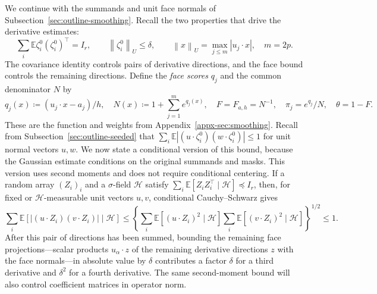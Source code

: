 \documentclass[11pt,letterpaper]{article}
\theoremstyle{remark}
\newcommand{\E}{\mathbb E}
\newcommand{\norm}[1]{\left\lVert#1\right\rVert}
\begin{document}
We continue with the summands and unit face normals of
Subsection~\ref{sec:outline-smoothing}. Recall the two properties
that drive the derivative estimates:
\begin{equation}
 \sum_i\E\zeta_i^0(\zeta_i^0)^\top=I_r,
 \qquad \norm{\zeta_i^0}_U\le\delta,
 \qquad \norm x_U=\max_{j\le m}|u_j\cdot x|,
 \quad m=2p.
 \label{appx-eq:projected-bound}
\end{equation}
The covariance identity controls pairs of derivative directions,
and the face bound controls the remaining directions. Define the
\emph{face scores} \(q_j\) and the common denominator \(N\) by
\begin{equation}
 \label{appx-an:basic-notation}
 q_j(x)\coloneqq(u_j\cdot x-a_j)/h,\quad
 N(x)\coloneqq1+\sum_{j=1}^m e^{q_j(x)},\quad
 F=F_{a,h}=N^{-1},\quad\pi_j=e^{q_j}/N,\quad\theta=1-F.
\end{equation}
These are the function and weights from Appendix~\ref{appx-sec:smoothing}.
{Recall from Subsection~\ref{sec:outline-seeded} that
\(\sum_i\E|(u\cdot\zeta_i^0)(w\cdot\zeta_i^0)|\le1\)
for unit normal vectors \(u,w\). We now state a conditional version of
this bound, because the Gaussian estimate conditions on the original
summands and masks. This version uses second moments and does not
require conditional centering.} If a random array \((Z_i)_i\)
and a \(\sigma\)-field \(\mathcal H\) satisfy
\(\sum_i\E[Z_iZ_i^\top\mid\mathcal H]\preceq I_r\), then, for
fixed or \(\mathcal H\)-measurable unit vectors \(u,v\),
conditional Cauchy--Schwarz gives
\begin{equation}
 \sum_i\E[|(u\cdot Z_i)(v\cdot Z_i)|\mid\mathcal H]
 \le\left\{\sum_i\E[(u\cdot Z_i)^2\mid\mathcal H]
           \sum_i\E[(v\cdot Z_i)^2\mid\mathcal H]\right\}^{1/2}
 \le1.
 \label{appx-an:pair-contraction}
\end{equation}
After this pair of directions has been summed, bounding the remaining
{
face projections---scalar products \(u_\alpha\cdot z\) of the remaining
derivative directions \(z\) with the face normals---in absolute value
by \(\delta\) contributes a factor \(\delta\)
}
for a third derivative and \(\delta^2\) for a fourth derivative.
The same second-moment bound will also control coefficient matrices
in operator norm.
\end{document}

